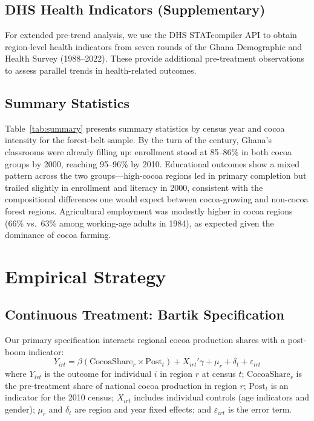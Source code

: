 \documentclass[12pt]{article}
\begin{document}
\subsection{DHS Health Indicators (Supplementary)}

For extended pre-trend analysis, we use the DHS STATcompiler API to obtain region-level health indicators from seven rounds of the Ghana Demographic and Health Survey (1988--2022). These provide additional pre-treatment observations to assess parallel trends in health-related outcomes.

\subsection{Summary Statistics}



Table~\ref{tab:summary} presents summary statistics by census year and cocoa intensity for the forest-belt sample. By the turn of the century, Ghana's classrooms were already filling up: enrollment stood at 85--86\% in both cocoa groups by 2000, reaching 95--96\% by 2010. Educational outcomes show a mixed pattern across the two groups---high-cocoa regions led in primary completion but trailed slightly in enrollment and literacy in 2000, consistent with the compositional differences one would expect between cocoa-growing and non-cocoa forest regions. Agricultural employment was modestly higher in cocoa regions (66\% vs.\ 63\% among working-age adults in 1984), as expected given the dominance of cocoa farming.


\section{Empirical Strategy}
\label{sec:strategy}

\subsection{Continuous Treatment: Bartik Specification}

Our primary specification interacts regional cocoa production shares with a post-boom indicator:
\begin{equation}
Y_{irt} = \beta (\text{CocoaShare}_r \times \text{Post}_t) + X_{irt}'\gamma + \mu_r + \delta_t + \varepsilon_{irt}
\label{eq:bartik}
\end{equation}
where $Y_{irt}$ is the outcome for individual $i$ in region $r$ at census $t$; $\text{CocoaShare}_r$ is the pre-treatment share of national cocoa production in region $r$; $\text{Post}_t$ is an indicator for the 2010 census; $X_{irt}$ includes individual controls (age indicators and gender); $\mu_r$ and $\delta_t$ are region and year fixed effects; and $\varepsilon_{irt}$ is the error term.
\end{document}
